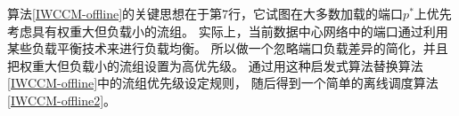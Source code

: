 %
%
% 
% 
% 
% 
%  
%
 
 
 算法\ref{IWCCM-offline}的关键思想在于第7行，它试图在大多数加载的端口$ p^* $上优先考虑具有权重大但负载小的流组。
 实际上，当前数据中心网络中的端口通过利用某些负载平衡技术来进行负载均衡\cite {dean2008mapreduce}。
 所以做一个忽略端口负载差异的简化，并且把权重大但负载小的流组设置为高优先级。
 通过用这种启发式算法替换算法\ref{IWCCM-offline}中的流组优先级设定规则，
 随后得到一个简单的离线调度算法\ref{IWCCM-offline2}。
 
